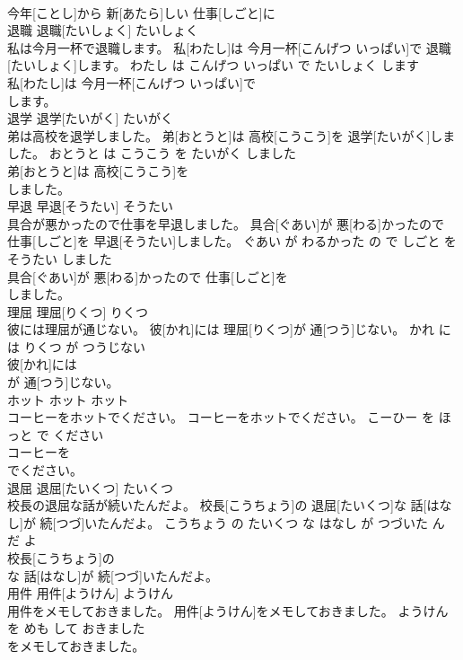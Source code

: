 \documentclass[8pt]{extreport}
\begin{document}
\begin{CJK}{UTF8}{min}
\\	今年[ことし]から 新[あたら]しい 仕事[しごと]に
\\	退職	退職[たいしょく]	たいしょく	
\\	私は今月一杯で退職します。	私[わたし]は 今月一杯[こんげつ いっぱい]で 退職[たいしょく]します。	わたし は こんげつ いっぱい で たいしょく します	
\\	私[わたし]は 今月一杯[こんげつ いっぱい]で
\\	します。			
\\	退学	退学[たいがく]	たいがく	
\\	弟は高校を退学しました。	弟[おとうと]は 高校[こうこう]を 退学[たいがく]しました。	おとうと は こうこう を たいがく しました	
\\	弟[おとうと]は 高校[こうこう]を
\\	しました。			
\\	早退	早退[そうたい]	そうたい	
\\	具合が悪かったので仕事を早退しました。	具合[ぐあい]が 悪[わる]かったので 仕事[しごと]を 早退[そうたい]しました。	ぐあい が わるかった の で しごと を そうたい しました	
\\	具合[ぐあい]が 悪[わる]かったので 仕事[しごと]を
\\	しました。			
\\	理屈	理屈[りくつ]	りくつ	
\\	彼には理屈が通じない。	彼[かれ]には 理屈[りくつ]が 通[つう]じない。	かれ に は りくつ が つうじない	
\\	彼[かれ]には
\\	が 通[つう]じない。			
\\	ホット	ホット	ホット	
\\	コーヒーをホットでください。	コーヒーをホットでください。	こーひー を ほっと で ください	
\\	コーヒーを
\\	でください。			
\\	退屈	退屈[たいくつ]	たいくつ	
\\	校長の退屈な話が続いたんだよ。	校長[こうちょう]の 退屈[たいくつ]な 話[はなし]が 続[つづ]いたんだよ。	こうちょう の たいくつ な はなし が つづいた ん だ よ	
\\	校長[こうちょう]の
\\	な 話[はなし]が 続[つづ]いたんだよ。			
\\	用件	用件[ようけん]	ようけん	
\\	用件をメモしておきました。	用件[ようけん]をメモしておきました。	ようけん を めも して おきました	
\\	をメモしておきました。			

\end{CJK}
\end{document}
